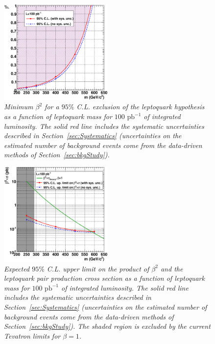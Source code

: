 \begin{figure}[h!]
 \centering
  \includegraphics[width=0.5\textwidth]{plots/cmsPotential/beta2_vs_m_excl.eps}
 \caption{\small \sl Minimum $\beta^2$ for
a $95\%$ C.L. exclusion of the leptoquark hypothesis as a function of leptoquark mass for $100\text{ pb}^{-1}$ of integrated luminosity. 
The solid red line includes the systematic uncertainties described in Section~\ref{sec:Systematics}
(uncertainties on the estimated number of background events come from the data-driven methods of Section~\ref{sec:bkgStudy}).
\label{fig:exclusion_beta}}
\end{figure}


\begin{figure}[h!]
 \centering
  \includegraphics[width=0.5\textwidth]{plots/cmsPotential/xs95CL_vs_m_log.eps}
 \caption{\small \sl Expected $95\%$ C.L. upper limit on the product of $\beta^2$ and the leptoquark pair production cross section 
as a function of leptoquark mass for $100\text{ pb}^{-1}$ of integrated luminosity. 
The solid red line includes the systematic uncertainties described in Section~\ref{sec:Systematics}
(uncertainties on the estimated number of background events come from the data-driven methods of Section~\ref{sec:bkgStudy}).
The shaded region is excluded by the current Tevatron limits for $\beta=1$.
\label{fig:exclusion_xs}}
\end{figure}


